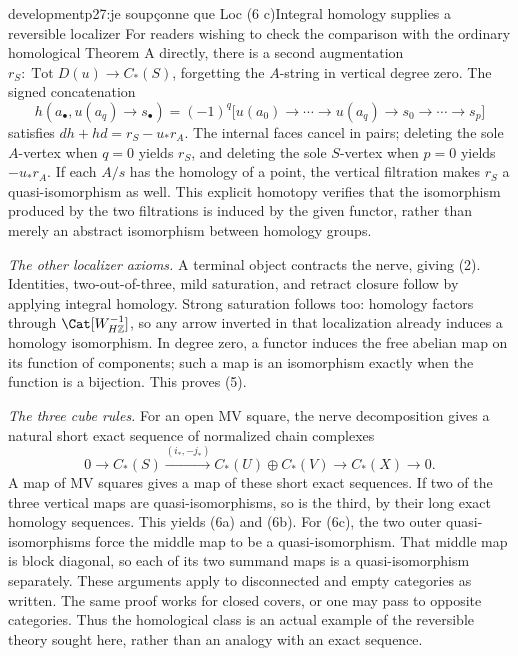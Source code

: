 \begin{dcomment}{development}{p27:je soupçonne que Loc (6 c)}{Integral homology supplies a reversible localizer}
For readers wishing to check the comparison with the ordinary homological Theorem A directly, there is a second augmentation $r_S:\operatorname{Tot}D(u)\to C_*(S)$, forgetting the $A$-string in vertical degree zero. The signed concatenation
\[
h(a_\bullet,u(a_q)\to s_\bullet)
 =(-1)^q\bigl[u(a_0)\to\cdots\to u(a_q)\to s_0\to\cdots\to s_p\bigr]
\]
satisfies $dh+hd=r_S-u_*r_A$. The internal faces cancel in pairs; deleting the sole $A$-vertex when $q=0$ yields $r_S$, and deleting the sole $S$-vertex when $p=0$ yields $-u_*r_A$. If each $A/s$ has the homology of a point, the vertical filtration makes $r_S$ a quasi-isomorphism as well. This explicit homotopy verifies that the isomorphism produced by the two filtrations is induced by the given functor, rather than merely an abstract isomorphism between homology groups.

\emph{The other localizer axioms.} A terminal object contracts the nerve, giving (2). Identities, two-out-of-three, mild saturation, and retract closure follow by applying integral homology. Strong saturation follows too: homology factors through $\Cat[W_{H\mathbb Z}^{-1}]$, so any arrow inverted in that localization already induces a homology isomorphism. In degree zero, a functor induces the free abelian map on its function of components; such a map is an isomorphism exactly when the function is a bijection. This proves (5).

\emph{The three cube rules.} For an open MV square, the nerve decomposition gives a natural short exact sequence of normalized chain complexes
\[
0\longrightarrow C_*(S)
 \xrightarrow{(i_*,-j_*)}C_*(U)\oplus C_*(V)
 \longrightarrow C_*(X)\longrightarrow0.
\]
A map of MV squares gives a map of these short exact sequences. If two of the three vertical maps are quasi-isomorphisms, so is the third, by their long exact homology sequences. This yields (6a) and (6b). For (6c), the two outer quasi-isomorphisms force the middle map to be a quasi-isomorphism. That middle map is block diagonal, so each of its two summand maps is a quasi-isomorphism separately. These arguments apply to disconnected and empty categories as written. The same proof works for closed covers, or one may pass to opposite categories. Thus the homological class is an actual example of the reversible theory sought here, rather than an analogy with an exact sequence.
\end{dcomment}

